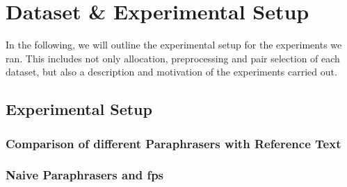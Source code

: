 \chapter{Dataset \& Experimental Setup}
\label{chap:dataset_experimental_setup}

In the following, we will outline the experimental setup for the experiments we ran.
This includes not only allocation, preprocessing and pair selection of each dataset, but also a description and motivation of the experiments carried out.




\section{Experimental Setup}
\label{sec:experimental_setup}





\subsection{Comparison of different Paraphrasers with Reference Text}



\subsection{Naive Paraphrasers and \acp{fp}}









